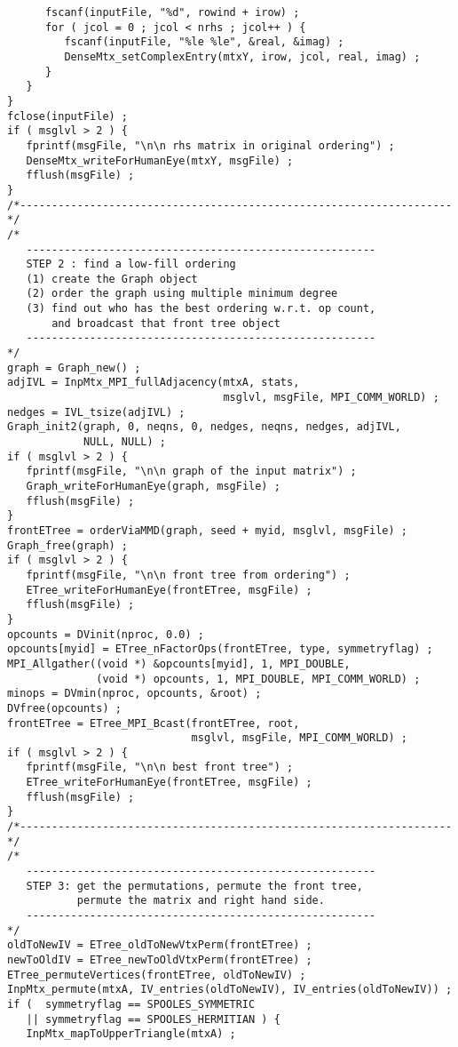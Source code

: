 \begin{verbatim}
      fscanf(inputFile, "%d", rowind + irow) ;
      for ( jcol = 0 ; jcol < nrhs ; jcol++ ) {
         fscanf(inputFile, "%le %le", &real, &imag) ;
         DenseMtx_setComplexEntry(mtxY, irow, jcol, real, imag) ;
      }
   }
}
fclose(inputFile) ;
if ( msglvl > 2 ) {
   fprintf(msgFile, "\n\n rhs matrix in original ordering") ;
   DenseMtx_writeForHumanEye(mtxY, msgFile) ;
   fflush(msgFile) ;
}
/*--------------------------------------------------------------------*/
/*
   -------------------------------------------------------
   STEP 2 : find a low-fill ordering
   (1) create the Graph object
   (2) order the graph using multiple minimum degree
   (3) find out who has the best ordering w.r.t. op count,
       and broadcast that front tree object
   -------------------------------------------------------
*/
graph = Graph_new() ;
adjIVL = InpMtx_MPI_fullAdjacency(mtxA, stats, 
                                  msglvl, msgFile, MPI_COMM_WORLD) ;
nedges = IVL_tsize(adjIVL) ;
Graph_init2(graph, 0, neqns, 0, nedges, neqns, nedges, adjIVL,
            NULL, NULL) ;
if ( msglvl > 2 ) {
   fprintf(msgFile, "\n\n graph of the input matrix") ;
   Graph_writeForHumanEye(graph, msgFile) ;
   fflush(msgFile) ;
}
frontETree = orderViaMMD(graph, seed + myid, msglvl, msgFile) ;
Graph_free(graph) ;
if ( msglvl > 2 ) {
   fprintf(msgFile, "\n\n front tree from ordering") ;
   ETree_writeForHumanEye(frontETree, msgFile) ;
   fflush(msgFile) ;
}
opcounts = DVinit(nproc, 0.0) ;
opcounts[myid] = ETree_nFactorOps(frontETree, type, symmetryflag) ;
MPI_Allgather((void *) &opcounts[myid], 1, MPI_DOUBLE,
              (void *) opcounts, 1, MPI_DOUBLE, MPI_COMM_WORLD) ;
minops = DVmin(nproc, opcounts, &root) ;
DVfree(opcounts) ;
frontETree = ETree_MPI_Bcast(frontETree, root, 
                             msglvl, msgFile, MPI_COMM_WORLD) ;
if ( msglvl > 2 ) {
   fprintf(msgFile, "\n\n best front tree") ;
   ETree_writeForHumanEye(frontETree, msgFile) ;
   fflush(msgFile) ;
}
/*--------------------------------------------------------------------*/
/*
   -------------------------------------------------------
   STEP 3: get the permutations, permute the front tree,
           permute the matrix and right hand side.
   -------------------------------------------------------
*/
oldToNewIV = ETree_oldToNewVtxPerm(frontETree) ;
newToOldIV = ETree_newToOldVtxPerm(frontETree) ;
ETree_permuteVertices(frontETree, oldToNewIV) ;
InpMtx_permute(mtxA, IV_entries(oldToNewIV), IV_entries(oldToNewIV)) ;
if (  symmetryflag == SPOOLES_SYMMETRIC 
   || symmetryflag == SPOOLES_HERMITIAN ) { 
   InpMtx_mapToUpperTriangle(mtxA) ;

\end{verbatim}
